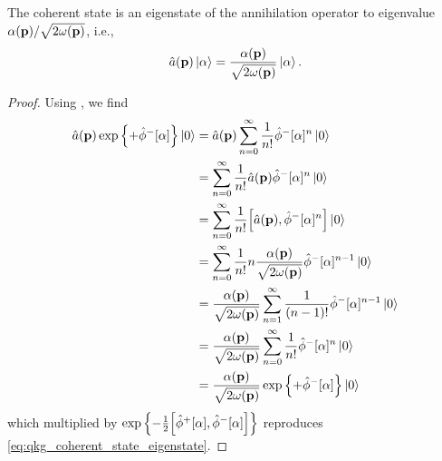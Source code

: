 \begin{theorem}\label{thm:qkg_coherent_state_eigenstate}
	The coherent state is an eigenstate of the annihilation operator to eigenvalue $\alpha(\vb{p})/\sqrt{2\omega(\vb{p})}$, i.e.,
	\begin{equation}\label{eq:qkg_coherent_state_eigenstate}
		\hat{a}(\vb{p})
		\ket{\alpha}
		=
		\frac{\alpha(\vb{p})}{\sqrt{2\omega(\vb{p})}}
		\ket{\alpha}
		.
	\end{equation}
\end{theorem}
\begin{proof}
	Using , we find
	\begin{equation*}
		\begin{split}
			\hat{a}(\vb{p})
			\exp\left\{
				+
				\hat\phi^-[\alpha]
			\right\}
			\ket{0}
			&=
			\hat{a}(\vb{p})
			\sum_{n=0}^\infty
			\frac{1}{n!}
			\hat\phi^-[\alpha]^n
			\ket{0}
			\\
			&=
			\sum_{n=0}^\infty
			\frac{1}{n!}
			\hat{a}(\vb{p})
			\hat\phi^-[\alpha]^n
			\ket{0}
			\\
			&=
			\sum_{n=0}^\infty
			\frac{1}{n!}
			\comm{\hat{a}(\vb{p})}{\hat\phi^-[\alpha]^n}
			\ket{0}
			\\
			&=
			\sum_{n=0}^\infty
			\frac{1}{n!}
			n
			\frac{\alpha(\vb{p})}{\sqrt{2\omega(\vb{p})}}
			\hat\phi^-[\alpha]^{n-1}
			\ket{0}
			\\
			&=
			\frac{\alpha(\vb{p})}{\sqrt{2\omega(\vb{p})}}
			\sum_{n=1}^\infty
			\frac{1}{(n-1)!}
			\hat\phi^-[\alpha]^{n-1}
			\ket{0}
			\\
			&=
			\frac{\alpha(\vb{p})}{\sqrt{2\omega(\vb{p})}}
			\sum_{n=0}^\infty
			\frac{1}{n!}
			\hat\phi^-[\alpha]^{n}
			\ket{0}
			\\
			&=
			\frac{\alpha(\vb{p})}{\sqrt{2\omega(\vb{p})}}
			\exp\left\{
				+
				\hat\phi^-[\alpha]
			\right\}
			\ket{0}
		\end{split}
	\end{equation*}
	which multiplied by $\exp\left\{-\frac{1}{2}\comm{\hat\phi^+[\alpha]}{\hat\phi^-[\alpha]}\right\}$ reproduces \cref{eq:qkg_coherent_state_eigenstate}.
\end{proof}

